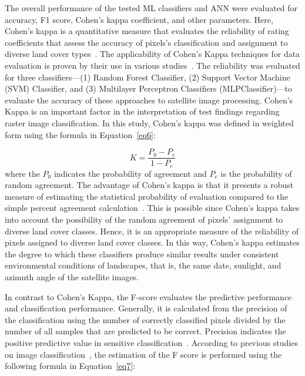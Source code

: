 \documentclass[jmse,article,accept,pdftex,oneauthor]{Definitions/mdpi}
\begin{document}
{The overall performance of the tested ML classifiers and ANN were evaluated for accuracy, F1 score, Cohen's kappa coefficient, and other parameters. Here, Cohen's kappa is a quantitative measure that evaluates the reliability of rating coefficients that   assess  the accuracy of pixels's classification and assignment to diverse land cover types~\cite{Cohen}. The applicability of Cohen's Kappa techniques for data evaluation is proven by their use in various studies~\cite{YU2024131896,LI2023138565,BONHOMME201596}. The reliability was evaluated for three  classifiers---(1) Random Forest Classifier, (2) Support Vector Machine (SVM) Classifier, and (3) Multilayer Perceptron Classifiers (MLPClassifier)---to evaluate the accuracy of these approaches to satellite image processing. Cohen's Kappa is an important factor in the interpretation of test findings regarding raster image classification. In this study, Cohen's kappa was defined in weighted form using the formula in Equation~\eqref{eq6}:}

\begin{equation}
K = \frac{P_0 - P_e}{1 - P_e}
\label{eq6}
\end{equation}
where the $P_0$ indicates the probability of agreement and $P_e$ is the probability of random agreement.
The advantage  of   Cohen's kappa is that it presents a robust measure of estimating the statistical probability of evaluation compared to the simple percent agreement calculation~\cite{Sim}. This is possible since Cohen's kappa takes into account the possibility of the random agreement of pixels' assignment to diverse land cover classes. Hence, it is an appropriate measure of the reliability of pixels assigned to diverse land cover classes. In this way, Cohen's kappa estimates the degree to which these classifiers produce similar results under consistent environmental conditions of landscapes, that is, the same date, sunlight, and azimuth angle of the satellite images.

In contrast to Cohen's Kappa, the F-score evaluates the predictive performance and classification performance. Generally, it is calculated from the precision of the classification using the number of correctly classified pixels divided by the number of all samples that are predicted to be correct. Precision indicates the positive predictive value in sensitive classification~\cite{Hand,sitarz2022extending}. According to previous studies on image classification~\cite{Taha}, the estimation of the F score is performed using the following formula in Equation~\eqref{eq7}:
\end{document}
